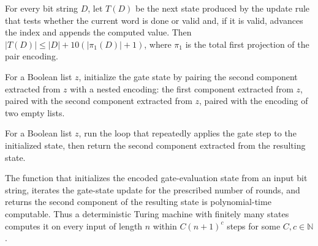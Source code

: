 \begin{theorem}
\label{Randomized.PIT.length_gStep_le}
\leanok
{}
For every bit string $D$, let $T(D)$ be the next state produced by the update rule that
tests whether the current word is done or valid and, if it is valid, advances the index
and appends the computed value. Then $|T(D)|\le |D|+10(|\pi_1(D)|+1)$, where $\pi_1$ is
the total first projection of the pair encoding.
\end{theorem}

\begin{definition}
\label{Randomized.PIT.gateInit}
\leanok
{}
For a Boolean list $z$, initialize the gate state by pairing the second component
extracted from $z$ with a nested encoding: the first component extracted from $z$,
paired with the second component extracted from $z$, paired with the encoding of two
empty lists.
\end{definition}

\begin{definition}
\label{Randomized.PIT.gateRun}
\leanok
{}
For a Boolean list $z$, run the loop that repeatedly applies the gate step to the
initialized state, then return the second component extracted from the resulting state.
\end{definition}

\begin{theorem}
\label{Randomized.PIT.polyTimeComputable_gateRun}
\leanok
{}
The function that initializes the encoded gate-evaluation state from an input bit
string, iterates the gate-state update for the prescribed number of rounds, and returns
the second component of the resulting state is polynomial-time computable. Thus a
deterministic Turing machine with finitely many states computes it on every input of
length $n$ within $C(n+1)^c$ steps for some $C,c\in\mathbb{N}$.
\end{theorem}

